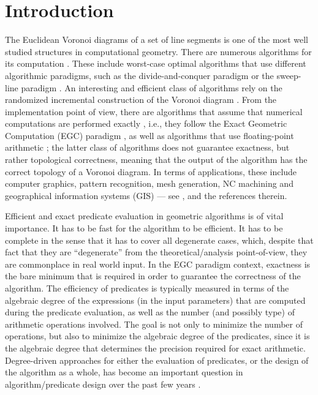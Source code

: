 \documentclass[letterpaper,11pt]{article}
\begin{document}
\clearpage


\section{Introduction}

The Euclidean Voronoi diagrams of a set of line segments is one of the
most well studied structures in computational geometry. There are
numerous algorithms for its computation
\cite{dl-gvdp-78,k-eccs-79,l-matps-82,y-oavds-87,f-savd-87,
bdsty-arsol-92,kmm-ricav-93a}.
These include worst-case optimal algorithms that use different algorithmic
paradigms, such as the divide-and-conquer paradigm \cite{y-oavds-87} or the
sweep-line paradigm \cite{f-savd-87}. An interesting and efficient class of
algorithms rely on the randomized incremental construction of the
Voronoi diagram \cite{bdsty-arsol-92,kmm-ricav-93a}. From the
implementation point of view, there are algorithms that assume that
numerical computations are performed exactly \cite{s-avd-,k-reisv-04},
i.e., they follow the Exact Geometric Computation (EGC) paradigm
\cite{yd-ecp-95}, as well as algorithms that use floating-point
arithmetic \cite{i-toavd-96,siii-toiar-00,h-veare-01}; the latter 
class of algorithms does not guarantee exactness, but rather
topological correctness, meaning that the output of the algorithm has
the correct topology of a Voronoi diagram.
In terms of applications, these include computer graphics, pattern
recognition, mesh generation, NC machining and geographical
information systems (GIS) --- see
\cite{k-eccs-79,l-matps-82,by-ag-98,h-veare-01,g-dcssg-10}, and the
references therein.

Efficient and exact predicate evaluation in geometric algorithms is of
vital importance. It has to be fast for the algorithm to be efficient.
It has to be complete in the sense that it has to cover all degenerate
cases, which, despite that fact that they are ``degenerate'' from the
theoretical/analysis point-of-view, they are commonplace in real world
input. In the EGC paradigm context, exactness is the bare minimum that
is required in order to guarantee the correctness of the
algorithm. The efficiency of predicates is typically measured in terms
of the algebraic degree of the expressions (in the input parameters)
that are computed during the predicate evaluation, as well as the
number (and possibly type) of arithmetic operations involved. The goal
is not only to minimize the number of operations, but also
to minimize the algebraic degree of the predicates, since it is the
algebraic degree that determines the precision required for exact
arithmetic. Degree-driven approaches for either the evaluation of
predicates, or the design of the algorithm as a whole, has become an
important question in algorithm/predicate design over the past few
years \cite{b-ecvdl-96,LiPrTa99,bp-rpsis-00,DFMT02,KE03,EK06,ms-cpvdd-10}.
\end{document}
